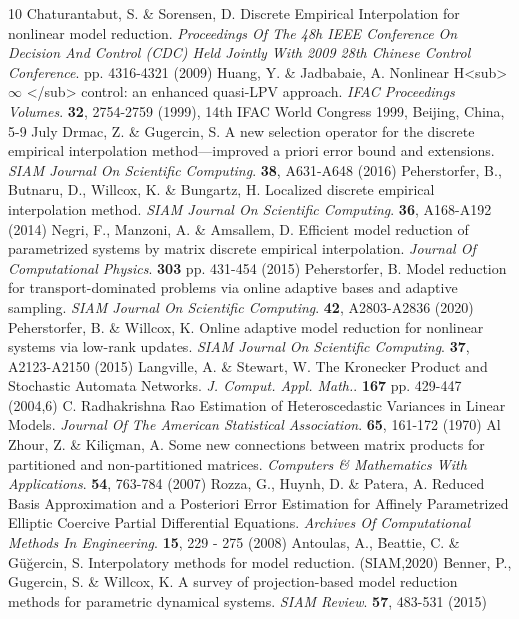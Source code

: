 \documentclass{article}
\begin{document}
\begin{thebibliography}{10}
Chaturantabut, S. \& Sorensen, D. Discrete Empirical Interpolation for nonlinear model reduction. {\em Proceedings Of The 48h IEEE Conference On Decision And Control (CDC) Held Jointly With 2009 28th Chinese Control Conference}. pp. 4316-4321 (2009)
Huang, Y. \& Jadbabaie, A. Nonlinear H<sub> $\infty$ </sub> control: an enhanced quasi-LPV approach. {\em IFAC Proceedings Volumes}. \textbf{32}, 2754-2759 (1999), 14th IFAC World Congress 1999, Beijing, China, 5-9 July
Drmac, Z. \& Gugercin, S. A new selection operator for the discrete empirical interpolation method—improved a priori error bound and extensions. {\em SIAM Journal On Scientific Computing}. \textbf{38}, A631-A648 (2016)
Peherstorfer, B., Butnaru, D., Willcox, K. \& Bungartz, H. Localized discrete empirical interpolation method. {\em SIAM Journal On Scientific Computing}. \textbf{36}, A168-A192 (2014)
Negri, F., Manzoni, A. \& Amsallem, D. Efficient model reduction of parametrized systems by matrix discrete empirical interpolation. {\em Journal Of Computational Physics}. \textbf{303} pp. 431-454 (2015)
Peherstorfer, B. Model reduction for transport-dominated problems via online adaptive bases and adaptive sampling. {\em SIAM Journal On Scientific Computing}. \textbf{42}, A2803-A2836 (2020)
Peherstorfer, B. \& Willcox, K. Online adaptive model reduction for nonlinear systems via low-rank updates. {\em SIAM Journal On Scientific Computing}. \textbf{37}, A2123-A2150 (2015)
Langville, A. \& Stewart, W. The Kronecker Product and Stochastic Automata Networks. {\em J. Comput. Appl. Math.}. \textbf{167} pp. 429-447 (2004,6)
C. Radhakrishna Rao Estimation of Heteroscedastic Variances in Linear Models. {\em Journal Of The American Statistical Association}. \textbf{65}, 161-172 (1970)
Al Zhour, Z. \& Kiliçman, A. Some new connections between matrix products for partitioned and non-partitioned matrices. {\em Computers \& Mathematics With Applications}. \textbf{54}, 763-784 (2007)
Rozza, G., Huynh, D. \& Patera, A. Reduced Basis Approximation and a Posteriori Error Estimation for Affinely Parametrized Elliptic Coercive Partial Differential Equations. {\em Archives Of Computational Methods In Engineering}. \textbf{15}, 229 - 275 (2008)
Antoulas, A., Beattie, C. \& Güğercin, S. Interpolatory methods for model reduction. (SIAM,2020)
Benner, P., Gugercin, S. \& Willcox, K. A survey of projection-based model reduction methods for parametric dynamical systems. {\em SIAM Review}. \textbf{57}, 483-531 (2015)

\end{thebibliography}
\end{document}
